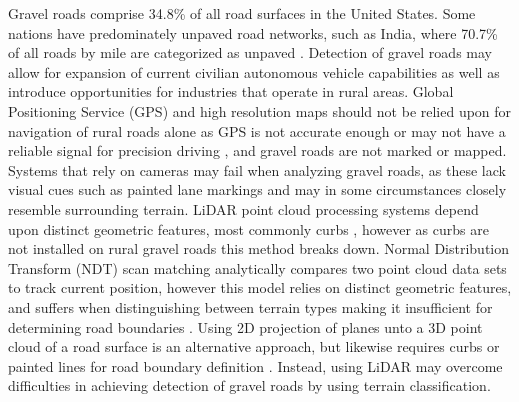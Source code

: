 \documentclass[journal,onecolumn]{IEEEtran}
\begin{document}
	{Gravel roads comprise 34.8\% \cite{road_stats_2} of all road surfaces in the United States. Some nations have predominately unpaved road networks, such as India, where 70.7\% of all roads by mile are categorized as unpaved \cite{malik_lal_2019}. Detection of gravel roads may allow for expansion of current civilian autonomous vehicle capabilities as well as introduce opportunities for industries that operate in rural areas. Global Positioning Service (GPS) and high resolution maps should not be relied upon for navigation of rural roads alone as GPS is not accurate enough or may not have a reliable signal for precision driving \cite{noauthor_gpsgov_nodate}, and gravel roads are not marked or mapped. Systems that rely on cameras may fail when analyzing gravel roads, as these lack visual cues such as painted lane markings \cite{crisman_scarf_1993} and may in some circumstances closely resemble surrounding terrain. LiDAR point cloud processing systems depend upon distinct geometric features, most commonly curbs \cite{yadav_extraction_2017,liu_new_2013,qiu_fast_2016,fernandes_road_2014,seker_experiments_nodate,yang_semi-automated_2013,miyazaki_line-based_2014,hervieu_road_2013,smadja_road_nodate}, however as curbs are not installed on rural gravel roads \cite{skorseth_gravel_nodate} this method breaks down. Normal Distribution Transform (NDT) scan matching analytically compares two point cloud data sets to track current position, however this model relies on distinct geometric features, and suffers when distinguishing between terrain types making it insufficient for determining road boundaries \cite{biber_normal_2003}. Using 2D projection of planes unto a 3D point cloud of a road surface is an alternative approach, but likewise requires curbs or painted lines for road boundary definition \cite{fernandes_road_2014, borkar_robust_2009-1, guo_lane_2015}. Instead, using LiDAR may overcome difficulties in achieving detection of gravel roads by using terrain classification.} 
	
\end{document}
